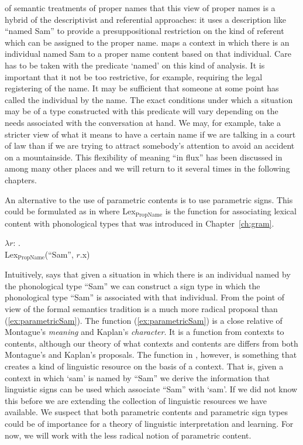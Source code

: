 of semantic treatments of proper names that this view of proper
names is a hybrid of the descriptivist and referential approaches:
it uses a description like ``named Sam'' to provide a presuppositional
restriction on the kind of referent which can be assigned to the
proper name.  \preveg{}
maps a context in which there is an individual named Sam to a proper
name content based on that individual.  Care has to be taken with the
predicate `named' on this kind of analysis.  It is important that it
not be too restrictive, for example, requiring the legal registering
of the name.  It may be sufficient that someone at some point has
called the individual by the name.  The exact conditions under which a
situation may be of a type constructed with this predicate will vary
depending on the needs associated with the conversation at hand.  We
may, for example, take a stricter view of what it means to have a
certain name if we are talking in a court of law than if we are trying
to attract somebody's attention to avoid an accident on a
mountainside.  This flexibility of meaning ``in flux'' has been
discussed in \cite{CooperKempson2008,Cooper2012,Ludlow2014,GinzburgCooper2014,KrachtKlein2014} among many other
places and we will return to it several times in the following chapters.

An alternative to the use of parametric contents is to use parametric
signs.  This could be formulated as in \nexteg{} where
Lex$_{\mathrm{PropName}}$ is the function for associating lexical
content with phonological types that was introduced in
Chapter~\ref{ch:gram}.
\begin{ex} 
$\lambda r$: . \\
\hspace*{5em}Lex$_{\mathrm{PropName}}$(``Sam'', $r$.x) 
\end{ex} 
Intuitively, \preveg{} says that given a situation in which there is
an individual named by the phonological type ``Sam'' we can construct
a sign type in which the phonological type ``Sam'' is associated with
that individual.  From the point of view of the formal semantics
tradition \preveg{} is a much more radical proposal than
(\ref{ex:parametricSam}).  The function (\ref{ex:parametricSam}) is a
close relative of Montague's \textit{meaning} and Kaplan's \textit{character}.
It is a function from contexts to contents, although our theory of
what contexts and contents are differs from both Montague's and
Kaplan's proposals.  The function in \preveg{}, however, is something
that creates a kind of linguistic resource on the basis of a context.
That is, given a context in which `sam' is named by ``Sam'' we derive
the information that linguistic signs can be used which associate
``Sam'' with `sam'.  If we did not know this before we are extending
the collection of linguistic resources we have available.  We suspect
that both parametric contents and parametric sign types could be of
importance for a theory of linguistic interpretation and learning.
For now, we will work with the less radical notion of parametric
content.  

